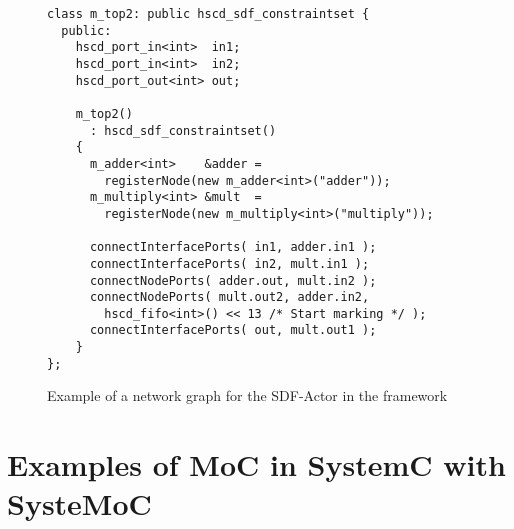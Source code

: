 \begin{figure}[h]
\centering
\begin{verbatim}
class m_top2: public hscd_sdf_constraintset {
  public:
    hscd_port_in<int>  in1;
    hscd_port_in<int>  in2;
    hscd_port_out<int> out;
    
    m_top2()
      : hscd_sdf_constraintset()
    {
      m_adder<int>    &adder =
        registerNode(new m_adder<int>("adder"));
      m_multiply<int> &mult  =
        registerNode(new m_multiply<int>("multiply"));
      
      connectInterfacePorts( in1, adder.in1 );
      connectInterfacePorts( in2, mult.in1 );
      connectNodePorts( adder.out, mult.in2 );
      connectNodePorts( mult.out2, adder.in2,
        hscd_fifo<int>() << 13 /* Start marking */ );
      connectInterfacePorts( out, mult.out1 );
    }
};
\end{verbatim}
\caption{\label{example-sdf-constraintset}Example of a network graph for the SDF-Actor in the \SysteMoC{} framework}
\end{figure}




\section{Examples of MoC in SystemC with SysteMoC}\label{systemoc-examples}

